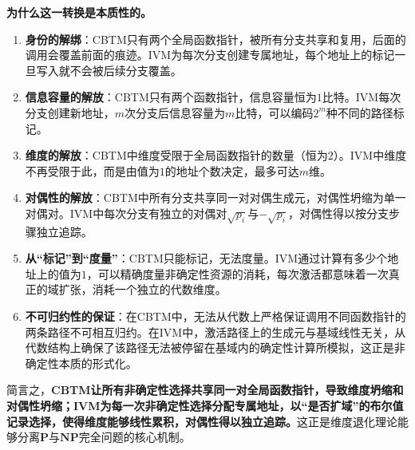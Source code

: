 \documentclass{ctexart}
\begin{document}
	\textbf{为什么这一转换是本质性的。}
	\begin{enumerate}
		\item \textbf{身份的解绑}：CBTM只有两个全局函数指针，被所有分支共享和复用，后面的调用会覆盖前面的痕迹。IVM为每次分支创建专属地址，每个地址上的标记一旦写入就不会被后续分支覆盖。
		\item \textbf{信息容量的解放}：CBTM只有两个函数指针，信息容量恒为$1$比特。IVM每次分支创建新地址，$m$次分支后信息容量为$m$比特，可以编码$2^m$种不同的路径标记。
		\item \textbf{维度的解放}：CBTM中维度受限于全局函数指针的数量（恒为$2$）。IVM中维度不再受限于此，而是由值为$1$的地址个数决定，最多可达$m$维。
		\item \textbf{对偶性的解放}：CBTM中所有分支共享同一对对偶生成元，对偶性坍缩为单一对偶对。IVM中每次分支有独立的对偶对$\sqrt{p_i}$与$-\sqrt{p_i}$，对偶性得以按分支步骤独立追踪。
		\item \textbf{从``标记''到``度量''}：CBTM只能标记，无法度量。IVM通过计算有多少个地址上的值为$1$，可以精确度量非确定性资源的消耗，每次激活都意味着一次真正的域扩张，消耗一个独立的代数维度。
		\item \textbf{不可归约性的保证}：在CBTM中，无法从代数上严格保证调用不同函数指针的两条路径不可相互归约。在IVM中，激活路径上的生成元与基域线性无关，从代数结构上确保了该路径无法被停留在基域内的确定性计算所模拟，这正是非确定性本质的形式化。
	\end{enumerate}
	
	简言之，\textbf{CBTM让所有非确定性选择共享同一对全局函数指针，导致维度坍缩和对偶性坍缩；IVM为每一次非确定性选择分配专属地址，以``是否扩域''的布尔值记录选择，使得维度能够线性累积，对偶性得以独立追踪。}这正是维度退化理论能够分离$\mathbf{P}$与$\mathbf{NP}$完全问题的核心机制。
	
	
	
	
\end{document}
